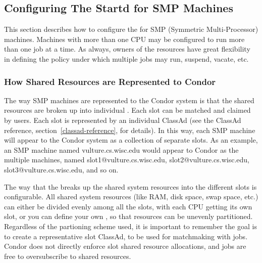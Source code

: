 \subsection{\label{sec:Configuring-SMP}
Configuring The Startd for SMP Machines}

This section describes how to configure the  for SMP
(Symmetric Multi-Processor) machines.
Machines with more than one CPU may
be configured to run more than one job at a time.
As always, owners of the resources have great flexibility in defining
the policy under which multiple jobs may run, suspend, vacate, etc.  

\subsubsection{\label{sec:How-Resources-Represented}
How Shared Resources are Represented to Condor}

The way SMP machines are represented to the Condor system is that
the shared resources are broken up into individual .
Each slot can be matched and claimed by users.
Each slot is represented by an individual ClassAd
(see the ClassAd reference, section~\ref{classad-reference}, for
details). 
In this way, each SMP machine will appear to the Condor system as
a collection of separate slots.  
As an example, an SMP machine named
vulture.cs.wisc.edu would appear to Condor as the
multiple machines, named slot1@vulture.cs.wisc.edu,
slot2@vulture.cs.wisc.edu,
slot3@vulture.cs.wisc.edu, and so on.

The way that the  breaks up the
shared system resources into the different slots
is configurable.
All shared system resources (like RAM, disk space, swap space, etc.)
can either be divided evenly among all the slots, with each
CPU getting its own slot, or you can define your own
, so that resources can be unevenly
partitioned.  Regardless of the partioning scheme used, it is important
to remember the goal is to create a representative slot
ClassAd, to be used for matchmaking with jobs.  Condor does not
directly enforce slot shared resource allocations, and jobs
are free to oversubscribe to shared resources.

